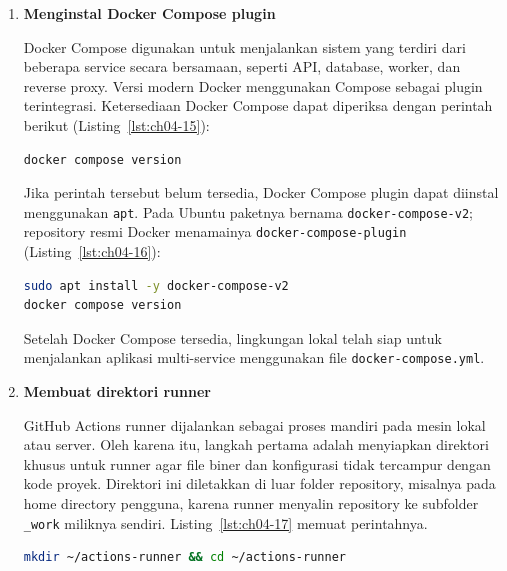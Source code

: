 \begin{enumerate}
\begin{lstlisting}[language=bash, caption={Perintah sudo usermod -aG docker \$USER}, label={lst:ch04-14}]
sudo usermod -aG docker $USER
# logout dan login kembali
docker ps
\end{lstlisting}

\item \textbf{Menginstal Docker Compose plugin}

Docker Compose digunakan untuk menjalankan sistem yang terdiri dari beberapa
service secara bersamaan, seperti API, database, worker, dan reverse proxy.
Versi modern Docker menggunakan Compose sebagai plugin terintegrasi.
Ketersediaan Docker Compose dapat diperiksa dengan perintah berikut (Listing~\ref{lst:ch04-15}):

\begin{lstlisting}[language=bash, caption={Perintah docker compose version}, label={lst:ch04-15}]
docker compose version
\end{lstlisting}

Jika perintah tersebut belum tersedia, Docker Compose plugin dapat diinstal
menggunakan \texttt{apt}. Pada Ubuntu paketnya bernama \texttt{docker-compose-v2};
repository resmi Docker menamainya \texttt{docker-compose-plugin} (Listing~\ref{lst:ch04-16}):

\begin{lstlisting}[language=bash, caption={Memasang paket docker-compose-v2}, label={lst:ch04-16}]
sudo apt install -y docker-compose-v2
docker compose version
\end{lstlisting}

Setelah Docker Compose tersedia, lingkungan lokal telah siap untuk menjalankan
aplikasi multi-service menggunakan file \texttt{docker-compose.yml}.


  \item \textbf{Membuat direktori runner}

GitHub Actions runner dijalankan sebagai proses mandiri pada mesin lokal
atau server. Oleh karena itu, langkah pertama adalah menyiapkan direktori
khusus untuk runner agar file biner dan konfigurasi tidak tercampur dengan
kode proyek. Direktori ini diletakkan di luar folder repository, misalnya pada home directory pengguna, karena runner menyalin repository ke subfolder \texttt{\_work} miliknya sendiri. Listing~\ref{lst:ch04-17} memuat perintahnya.

\begin{lstlisting}[language=bash, caption={Perintah mkdir \textasciitilde/actions-runner \&\& cd \textasciitilde/actions-runner}, label={lst:ch04-17}]
mkdir ~/actions-runner && cd ~/actions-runner
\end{lstlisting}


\end{enumerate}

